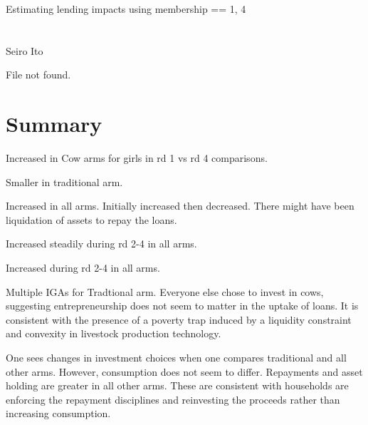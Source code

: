 \setlength{\baselineskip}{12pt}









\hfil Estimating lending impacts using \textsf{membership} == 1, 4\\

\hfil\MonthDY\\
\hfil{\footnotesize\currenttime}\\

\hfil Seiro Ito

\setcounter{tocdepth}{3}
\tableofcontents
\newpage

\setlength{\parindent}{1em}
\vspace{2ex}


\begin{Schunk}
\begin{Soutput}
File not found.
\end{Soutput}
\end{Schunk}


\section{Summary}

\begin{description}
\vspace{1.0ex}\setlength{\itemsep}{1.0ex}\setlength{\baselineskip}{12pt}
\item[Schooling]	Increased in \textsf{Cow} arms for girls in rd 1 vs rd 4 comparisons.
\item[Net saving and repayments]	Smaller in \textsf{traditional} arm.
\item[Assets]	Increased in all arms. Initially increased then decreased. There might have been liquidation of assets to repay the loans.
\item[Labour incomes]	Increased steadily during rd 2-4 in all arms. 
\item[Consumption]	Increased during rd 2-4 in all arms.
\item[IGAs]	Multiple IGAs for \textsf{Tradtional} arm. Everyone else chose to invest in cows, suggesting entrepreneurship does not seem to matter in the uptake of loans. It is consistent with the presence of a poverty trap induced by a liquidity constraint and convexity in livestock production technology.
\end{description}
One sees changes in investment choices when one compares \textsf{traditional} and all other arms. However, consumption does not seem to differ. Repayments and asset holding are greater in all other arms. These are consistent with households are enforcing the repayment disciplines and reinvesting the proceeds rather than increasing consumption. 


